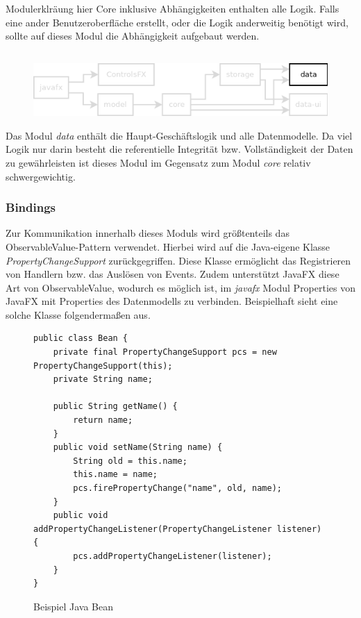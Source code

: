 Modulerklräung hier
Core inklusive Abhängigkeiten enthalten alle Logik. Falls eine ander Benutzeroberfläche erstellt,
oder die Logik anderweitig benötigt wird, sollte auf dieses Modul die Abhängigkeit aufgebaut werden.




\subsection{\textModData}
\label{\textModData}
\begin{figure}[h!]
	\centering
	\includegraphics[width=.8\textwidth]{module_dependencies_data.png}
\end{figure}

Das Modul \textit{data} enthält die Haupt-Geschäftslogik und alle Datenmodelle. Da viel Logik nur darin besteht
die referentielle Integrität bzw. Vollständigkeit der Daten zu gewährleisten ist dieses Modul im Gegensatz zum
Modul \textit{core} relativ schwergewichtig.

\subsubsection{Bindings}
Zur Kommunikation innerhalb dieses Moduls wird größtenteils das ObservableValue-Pattern verwendet. Hierbei wird auf
die Java-eigene Klasse \textit{PropertyChangeSupport} zurückgegriffen. Diese Klasse ermöglicht das Registrieren
von Handlern bzw. das Auslösen von Events. Zudem unterstützt JavaFX diese Art von ObservableValue, wodurch es
möglich ist, im \textit{javafx} Modul Properties von JavaFX mit Properties des Datenmodells zu verbinden. Beispielhaft
sieht eine solche Klasse folgendermaßen aus.

\begin{figure}[h!]
	\centering
	\begin{lstlisting}
public class Bean {
    private final PropertyChangeSupport pcs = new PropertyChangeSupport(this);
    private String name;

    public String getName() {
    	return name;
    }
    public void setName(String name) {
    	String old = this.name;
    	this.name = name;
    	pcs.firePropertyChange("name", old, name);
    }
    public void addPropertyChangeListener(PropertyChangeListener listener) {
    	pcs.addPropertyChangeListener(listener);
    }
}
	\end{lstlisting}
	\caption{Beispiel Java Bean}
\end{figure}

